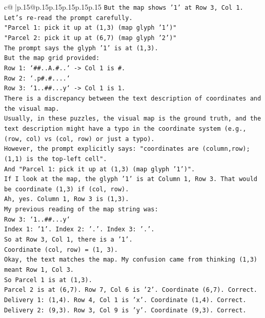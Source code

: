 \documentclass{article}
\begin{document}
{\begin{supertabular}{c@{$\;$}|p{.15\linewidth}@{}p{.15\linewidth}p{.15\linewidth}p{.15\linewidth}p{.15\linewidth}p{.15\linewidth}}
{{{\texttt{But the map shows '1' at Row 3, Col 1.} \\
\texttt{Let's re{-}read the prompt carefully.} \\
\texttt{"Parcel 1: pick it up at (1,3) (map glyph '1')"} \\
\texttt{"Parcel 2: pick it up at (6,7) (map glyph '2')"} \\
\texttt{The prompt says the glyph '1' is at (1,3).} \\
\texttt{But the map grid provided:} \\
\texttt{Row 1: `\#\#..A.\#..` {-}> Col 1 is \#.} \\
\texttt{Row 2: `.p\#.\#....`} \\
\texttt{Row 3: `1..\#\#...y` {-}> Col 1 is 1.} \\
\texttt{There is a discrepancy between the text description of coordinates and the visual map.} \\
\texttt{Usually, in these puzzles, the visual map is the ground truth, and the text description might have a typo in the coordinate system (e.g., (row, col) vs (col, row) or just a typo).} \\
\texttt{However, the prompt explicitly says: "coordinates are (column,row); (1,1) is the top{-}left cell".} \\
\texttt{And "Parcel 1: pick it up at (1,3) (map glyph '1')".} \\
\texttt{If I look at the map, the glyph '1' is at Column 1, Row 3. That would be coordinate (1,3) if (col, row).} \\
\texttt{Ah, yes. Column 1, Row 3 is (1,3).} \\
\texttt{My previous reading of the map string was:} \\
\texttt{Row 3: `1..\#\#...y`} \\
\texttt{Index 1: '1'. Index 2: '.'. Index 3: '.'.} \\
\texttt{So at Row 3, Col 1, there is a '1'.} \\
\texttt{Coordinate (col, row) = (1, 3).} \\
\texttt{Okay, the text matches the map. My confusion came from thinking (1,3) meant Row 1, Col 3.} \\
\texttt{So Parcel 1 is at (1,3).} \\
\texttt{Parcel 2 is at (6,7). Row 7, Col 6 is '2'. Coordinate (6,7). Correct.} \\
\texttt{Delivery 1: (1,4). Row 4, Col 1 is 'x'. Coordinate (1,4). Correct.} \\
\texttt{Delivery 2: (9,3). Row 3, Col 9 is 'y'. Coordinate (9,3). Correct.} \\
}}}
\end{supertabular}}
\end{document}
